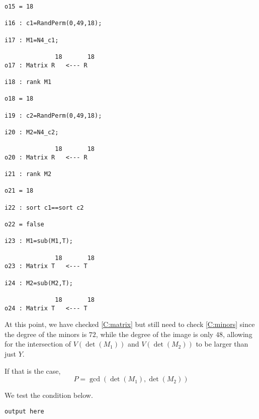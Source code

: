 \documentclass[fleqn,reqno]{amsart}
\begin{document}
\begin{example}[$\mt{ex603}$]
\begin{verbatim}
o15 = 18

i16 : c1=RandPerm(0,49,18);

i17 : M1=N4_c1;

              18       18
o17 : Matrix R   <--- R

i18 : rank M1

o18 = 18

i19 : c2=RandPerm(0,49,18);

i20 : M2=N4_c2;

              18       18
o20 : Matrix R   <--- R

i21 : rank M2

o21 = 18

i22 : sort c1==sort c2

o22 = false

i23 : M1=sub(M1,T);

              18       18
o23 : Matrix T   <--- T

i24 : M2=sub(M2,T);

              18       18
o24 : Matrix T   <--- T
\end{verbatim}
At this point, we have checked \eqref{C:matrix} but still need to check \eqref{C:minors}
since the degree of the minors is $72$,
while the degree of the image is only $48$,
allowing for the intersection of $V(\det(M_1))$ and $V(\det(M_2))$
to be larger than just $Y$.

If that is the case,
\[
	P=\gcd(\det(M_1),\det(M_2))
\]

We test the condition below.
\begin{verbatim}
output here
\end{verbatim}
\end{example}





\end{document}
